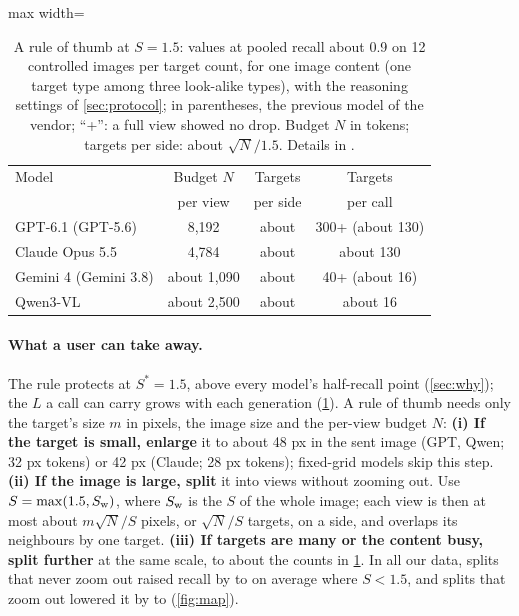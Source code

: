 \begin{table}[t]
\centering
\small
\setlength{\tabcolsep}{2pt}
\begin{adjustbox}{max width=\linewidth}\begin{tabular}{lccc}
\toprule
Model & Budget $N$ & Targets & Targets \\
 & per view & per side & per call \\
\midrule
GPT-6.1 (GPT-5.6) & 8{,}192 & about \CthumbSideGpt{} & 300+ (about 130) \\
Claude Opus 5.5 & 4{,}784 & about \CthumbSideClaude{} & about 130 \\
Gemini 4 (Gemini 3.8) & about 1{,}090 & about \CthumbSideGemini{} & 40+ (about 16) \\
Qwen3-VL & about 2{,}500 & about \CthumbSideQwen{} & about 16 \\
\bottomrule
\end{tabular}\end{adjustbox}
\caption{A rule of thumb at $S = 1.5$: values at pooled recall about 0.9 on 12 controlled images per target count, for one image content (one target type among three look-alike types), with the reasoning settings of \cref{sec:protocol}; in parentheses, the previous model of the vendor; ``+'': a full view showed no drop. Budget $N$ in tokens; targets per side: about $\sqrt{N}/1.5$. Details in .}
\label{tab:thumb}
\end{table}

\paragraph{What a user can take away.}
The rule protects at $S^\ast = 1.5$, above every model's half-recall point (\cref{sec:why}); the $L$ a call can carry grows with each generation (\cref{tab:thumb}). A rule of thumb needs only the target's size $m$ in pixels, the image size and the per-view budget $N$:
\textbf{(i) If the target is small, enlarge} it to about 48 px in the sent image (GPT, Qwen; 32 px tokens) or 42 px (Claude; 28 px tokens); fixed-grid models skip this step.
\textbf{(ii) If the image is large, split} it into views without zooming out. Use $S = \max(1.5, S_{\mathrm{w}})$, where $S_{\mathrm{w}}$ is the $S$ of the whole image; each view is then at most about $m\sqrt{N}/S$ pixels, or $\sqrt{N}/S$ targets, on a side, and overlaps its neighbours by one target.
\textbf{(iii) If targets are many or the content busy, split further} at the same scale, to about the counts in \cref{tab:thumb}.
In all our data, splits that never zoom out raised recall by \CmapBelowMin{} to \CmapBelowMax{} on average where $S < 1.5$, and splits that zoom out lowered it by \CmapZoomMin{} to \CmapZoomMax{} (\cref{fig:map}).

